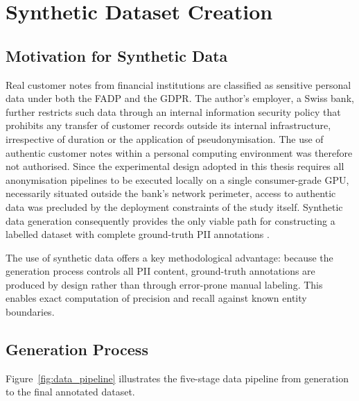 \section{Synthetic Dataset Creation}
\label{sec:data_creation}

\subsection{Motivation for Synthetic Data}
\label{sec:data_motivation}

Real customer notes from financial institutions are classified as sensitive
personal data under both the FADP and the GDPR. The author's employer, a
Swiss bank, further restricts such data through an internal information
security policy that prohibits any transfer of customer records outside
its internal infrastructure, irrespective of duration or the application
of pseudonymisation. The use of authentic customer notes within a personal
computing environment was therefore not authorised. Since the experimental
design adopted in this thesis requires all anonymisation pipelines to be
executed locally on a single consumer-grade GPU, necessarily situated
outside the bank's network perimeter, access to authentic data was
precluded by the deployment constraints of the study itself. Synthetic
data generation consequently provides the only viable path for
constructing a labelled dataset with complete ground-truth PII
annotations \citep{tan2024llm_annotation}.

The use of synthetic data offers a key methodological advantage: because the
generation process controls all PII content, ground-truth annotations are
produced by design rather than through error-prone manual labeling. This enables
exact computation of precision and recall against known entity boundaries.


\subsection{Generation Process}
\label{sec:data_generation}

Figure~\ref{fig:data_pipeline} illustrates the five-stage data pipeline from
generation to the final annotated dataset.


